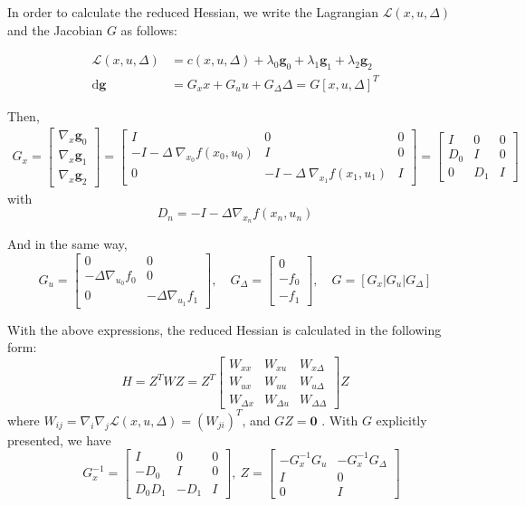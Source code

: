 \documentclass{article}
\begin{document}
In order to calculate the reduced Hessian, we write the Lagrangian  $ \mathcal L(x,u,\Delta)$ and the Jacobian $G$ as follows:

\[
\begin{aligned}
\mathcal{L}(x,u,\Delta) &=  c(x,u,\Delta)+ \lambda_0 \mathbf{g}_0+\lambda_1 \mathbf{g}_1+\lambda_2 \mathbf{g}_2 \\ 
\text{d} \mathbf{g} &= G_x x + G_u u + G_\Delta \Delta = G[x,u,\Delta]^T
\end{aligned}
\]

Then, 
\[
\begin{aligned}
G_x = \left[ \begin{matrix} \nabla_x\mathbf{g}_0 \\\nabla_x\mathbf{g}_1 \\\nabla_x\mathbf{g}_2 \end{matrix} \right] = \left[ \begin{matrix} I & 0& 0 \\ -I - \Delta \ \nabla_{x_0}f(x_0,u_0) & I& 0  \\ 0& -I - \Delta \ \nabla_{x_1}f(x_1,u_1) & I  \end{matrix}  \right] = \left[\begin{matrix} I&0&0\\ D_0& I &0\\ 0& D_1& I  \end{matrix}\right]
\end{aligned}
\]
with
\[
D_n = -I-\Delta \nabla_{x_n}f(x_n,u_n)
\]

And in the same way, 
\[
G_u = \left[ \begin{matrix} 0 & 0 \\ -\Delta \nabla_{u_0} f_0 & 0 \\ 0 & -\Delta \nabla_{u_1}f_1\end{matrix}\right], \quad G_\Delta = \left[ \begin{matrix}0 \\ -f_0 \\ - f_1  \end{matrix} \right],\quad G = [G_x|G_u|G_\Delta]
\]

With the above expressions, the reduced Hessian is calculated in the following form:
\[
H = Z^TWZ =Z^T\left[\begin{matrix} W_{xx}&W_{xu}&W_{x\Delta} \\ W_{ux}&W_{uu} &W_{u\Delta}  \\W_{\Delta x} & W_{\Delta u}& W_{\Delta\Delta} \end{matrix}\right] Z
\]
where $W_{ij} =\nabla_i\nabla_j \mathcal{L}(x,u,\Delta) =  (W_{ji})^T$, and $GZ = \mathbf{0}$
. With $G$ explicitly presented, we have
\[
 \quad G_x^{-1} = \left[\begin{matrix} I &0&0 \\ -D_0 &I& 0 \\ D_0D_1&-D_1&I \end{matrix}\right], \ Z = \left[\begin{matrix} -G_x^{-1} G_u& -G_x^{-1}G_\Delta \\ I&0 \\ 0&I  \end{matrix} \right]
\]
\end{document}
